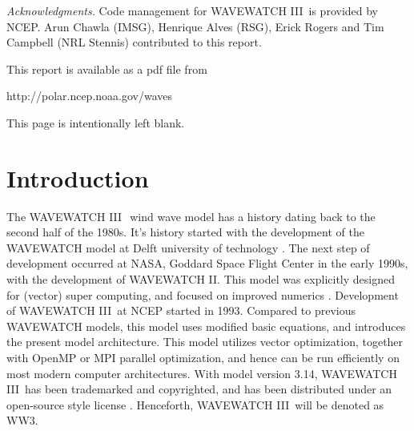 \documentclass[12pt]{article}
\newcommand{\pstyle}{plain}
\newcommand{\wwt}{WAVEWATCH III$\:$\textsuperscript\textregistered}
\newcommand{\ww}{WAVEWATCH III}
\newcommand{\ws}{WW3}
\newcommand{\pb}{\strut \vfill \pagebreak}
\newcommand{\bpagea}{\strut

\vspace{2.5in} \centerline{This page is intentionally left blank.}}
\newcommand{\newsec}{\setcounter{equation}{0}
                      \setcounter{myfigno}{0}
                      \setcounter{mytabno}{0}}
\newcounter{myfigno}[section]
\newcounter{mytabno}[section]
\begin{document}
\vfill \pagebreak



{\it Acknowledgments.} Code management for \ww\ is provided by NCEP. Arun
Chawla (IMSG), Henrique Alves (RSG), Erick Rogers and Tim Campbell (NRL
Stennis) contributed to this report.

\vspace{\baselineskip} \noindent
This report is available as a pdf file from

\vspace{\baselineskip}
\centerline{http://polar.ncep.noaa.gov/waves}


\vfill \pagebreak

\tableofcontents

\pb
\pagestyle{empty}

\bpagea


\pb
\pagestyle{\pstyle}
\section{Introduction} \label{sec:intro}
\newsec

\noindent
The \wwt\ wind wave model has a history dating back to the second half of the
1980s. It's history started with the development of the WAVEWATCH model at
Delft university of technology \citep{tol:CHGE89, tol:CHGE90, tol:JPO91b}. The
next step of development occurred at NASA, Goddard Space Flight Center in the
early 1990s, with the development of WAVEWATCH II. This model was explicitly
designed for (vector) super computing, and focused on improved numerics
\citep{tol:JPO92, tol:ICCE92}. Development of \ww\ at NCEP started in 1993.
Compared to previous WAVEWATCH models, this model uses modified basic
equations, and introduces the present model architecture. This model utilizes
vector optimization, together with OpenMP or MPI parallel optimization, and
hence can be run efficiently on most modern computer architectures.  With
model version 3.14, \ww\ has been trademarked and copyrighted, and has been
distributed under an open-source style license \citep[see section 1.2 of ][or
the web
site\footnote{~http://polar.ncep.noaa.gov/waves/wavewatch/license.shtml
}]{tol:MMAB09a}. Henceforth, \ww\ will be denoted as \ws.
\end{document}
